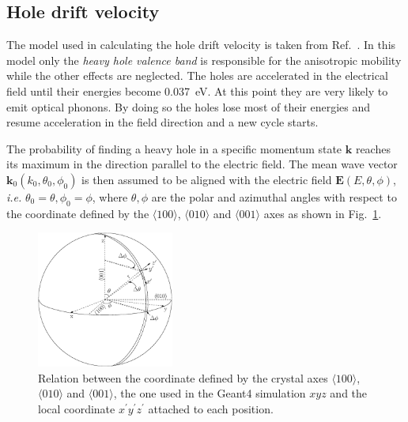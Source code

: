 \subsection{Hole drift velocity}
\label{sec:pss:hole}
The model used in calculating the hole drift velocity is taken from Ref.~\cite{bart}. In this model only the \emph{heavy hole valence band} is responsible for the anisotropic mobility while the other effects are neglected. The holes are accelerated in the electrical field until their energies become 0.037~eV. At this point they are very likely to emit optical phonons. By doing so the holes lose most of their energies and resume acceleration in the field direction and a new cycle starts. 

The probability of finding a heavy hole in a specific momentum state $\mathbf{k}$ reaches its maximum in the direction parallel to the electric field. The mean wave vector $\mathbf{k}_{0}(k_{0}, \theta_{0}, \phi_{0})$ is then assumed to be aligned with the electric field $\mathbf{E}(E, \theta, \phi)$, \textit{i.e.} $\theta_{0} = \theta, \phi_{0} = \phi$, where $\theta, \phi$ are the polar and azimuthal angles with respect to the coordinate defined by the $\langle 100 \rangle$, $\langle 010 \rangle$ and $\langle 001 \rangle$ axes as shown in Fig.~\ref{fig:pss:vsphere}.

\begin{figure}
\centering
\includegraphics[width=0.4\textwidth]{vsphere}  
\caption{Relation between the coordinate defined by the crystal axes $\langle100\rangle$, $\langle010\rangle$ and $\langle001\rangle$, the one used in the Geant4 simulation $xyz$ and the local coordinate $x^{\prime}y^{\prime}z^{\prime}$ attached to each position.}
\label{fig:pss:vsphere}
\end{figure}

